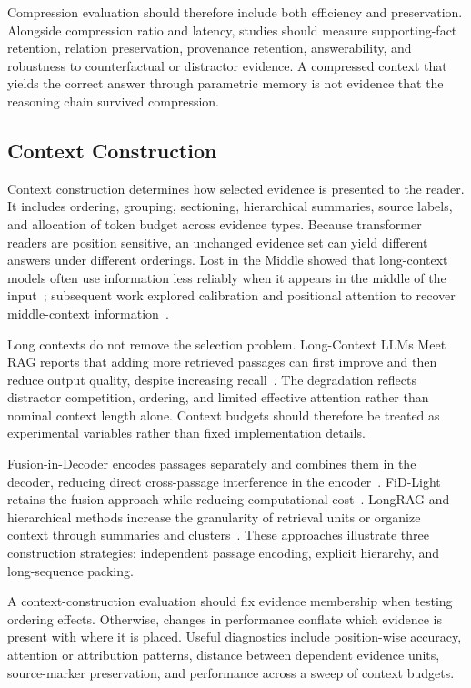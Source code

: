 Compression evaluation should therefore include both efficiency and preservation. Alongside compression ratio and latency, studies should measure supporting-fact retention, relation preservation, provenance retention, answerability, and robustness to counterfactual or distractor evidence. A compressed context that yields the correct answer through parametric memory is not evidence that the reasoning chain survived compression.

\subsection{Context Construction}
\label{subsec:context_construction}

Context construction determines how selected evidence is presented to the reader. It includes ordering, grouping, sectioning, hierarchical summaries, source labels, and allocation of token budget across evidence types. Because transformer readers are position sensitive, an unchanged evidence set can yield different answers under different orderings. Lost in the Middle showed that long-context models often use information less reliably when it appears in the middle of the input~\cite{liu2024lostmiddle}; subsequent work explored calibration and positional attention to recover middle-context information~\cite{tang2024found}.

Long contexts do not remove the selection problem. Long-Context LLMs Meet RAG reports that adding more retrieved passages can first improve and then reduce output quality, despite increasing recall~\cite{jin2025longcontextrag}. The degradation reflects distractor competition, ordering, and limited effective attention rather than nominal context length alone. Context budgets should therefore be treated as experimental variables rather than fixed implementation details.

Fusion-in-Decoder encodes passages separately and combines them in the decoder, reducing direct cross-passage interference in the encoder~\cite{izacard2021fid}. FiD-Light retains the fusion approach while reducing computational cost~\cite{hofstatter2023fidlight}. LongRAG and hierarchical methods increase the granularity of retrieval units or organize context through summaries and clusters~\cite{jiang2024longrag,sarthi2024raptor}. These approaches illustrate three construction strategies: independent passage encoding, explicit hierarchy, and long-sequence packing.

A context-construction evaluation should fix evidence membership when testing ordering effects. Otherwise, changes in performance conflate which evidence is present with where it is placed. Useful diagnostics include position-wise accuracy, attention or attribution patterns, distance between dependent evidence units, source-marker preservation, and performance across a sweep of context budgets.

